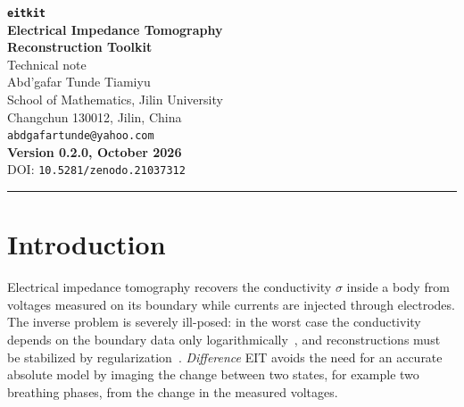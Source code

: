 \documentclass[11pt,a4paper]{article}
\newcommand{\seprule}{\vspace{4pt}\noindent\rule{\textwidth}{0.5pt}\vspace{4pt}}
\newcommand{\code}[1]{\texttt{#1}}
\begin{document}
\begin{center}
{\LARGE\bfseries\texttt{eitkit}}\\[6pt]
{\Large\bfseries Electrical Impedance Tomography\\[2pt]
 Reconstruction Toolkit}\\[10pt]
{\large Technical note}\\[10pt]
{\large Abd'gafar Tunde Tiamiyu}\\[4pt]
{\small School of Mathematics, Jilin University\\[2pt]
 Changchun 130012, Jilin, China}\\[4pt]
{\small\texttt{abdgafartunde@yahoo.com}}\\[12pt]
{\small\bfseries Version 0.2.0, October 2026}\\[4pt]
{\small DOI: \texttt{10.5281/zenodo.21037312}}\\[4pt]
\seprule
\end{center}

\renewcommand{\abstractname}{Summary}
\begin{abstract}
\noindent
\texttt{eitkit} is an open-source Python package for two-dimensional
difference electrical impedance tomography (EIT) on the disc. It generates
triangular meshes, simulates electrode voltages with piecewise-linear finite
elements and a point (gap) electrode model, computes the Jacobian with the
adjoint method, and reconstructs conductivity changes with Tikhonov
regularization (with an L-curve parameter choice) and total-variation
regularization (with ADMM). This note documents the model and every
algorithm as implemented, maps each step to the function that performs it,
reports the verification results (convergence to a closed-form solution,
finite-difference and reciprocity checks, golden-output tests), gives
practical guidance on choosing the mesh size and the regularization
parameters, and states the limitations. A step-by-step tutorial is provided
separately as \code{examples/00\_getting\_started.ipynb}.
\end{abstract}

\tableofcontents

\section{Introduction}

Electrical impedance tomography recovers the conductivity $\sigma$ inside a
body from voltages measured on its boundary while currents are injected
through electrodes. The inverse problem is severely ill-posed: in the worst
case the conductivity depends on the boundary data only
logarithmically~\cite{Mandache2001}, and reconstructions must be stabilized
by regularization~\cite{Borcea2002,CheneyIsaacsonNewell1999}.
\emph{Difference} EIT avoids the need for an accurate absolute model by
imaging the change between two states, for example two breathing phases,
from the change in the measured voltages.
\end{document}
